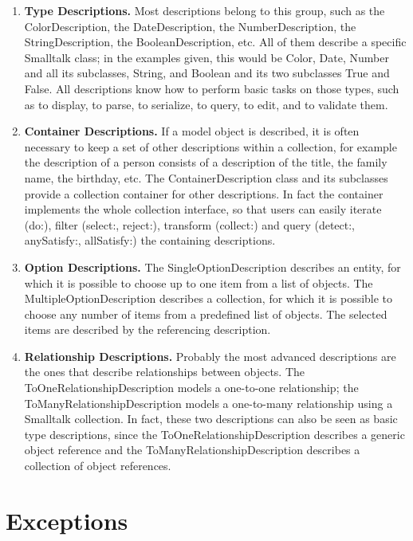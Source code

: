 \documentclass[a4paper,10pt,twoside]{book}
\newcommand{\ct}[1]{{\small\ttfamily\textup{#1}}}
\begin{document}
\begin{enumerate}
\item \textbf{Type Descriptions.} Most descriptions belong to this group, such as the \ct{ColorDescription}, the \ct{DateDescription}, the \ct{NumberDescription}, the \ct{StringDescription}, the \ct{BooleanDescription}, etc. All of them describe a specific Smalltalk class; in the examples given, this would be Color, Date, Number and all its subclasses, String, and Boolean and its two subclasses True and False. All descriptions know how to perform basic tasks on those types, such as to display, to parse, to serialize, to query, to edit, and to validate them.
\item \textbf{Container Descriptions.} If a model object is described, it is often necessary to keep a set of other descriptions within a collection, for example the description of a person consists of a description of the title, the family name, the birthday, etc. The \ct{ContainerDescription} class and its subclasses provide a collection container for other descriptions. In fact the container implements the whole collection interface, so that users can easily iterate (\ct{do:}), filter (\ct{select:}, \ct{reject:}), transform (\ct{collect:}) and query (\ct{detect:}, \ct{anySatisfy:}, \ct{allSatisfy:}) the containing descriptions.
\item \textbf{Option Descriptions.} The \ct{SingleOptionDescription} describes an entity, for which it is possible to choose up to one item from a list of objects. The \ct{MultipleOptionDescription} describes a collection, for which it is possible to choose any number of items from a predefined list of objects. The selected items are described by the referencing description.
\item \textbf{Relationship Descriptions.} Probably the most advanced descriptions are the ones that describe relationships between objects. The \ct{ToOneRelationshipDescription} models a one-to-one relationship; the \ct{ToManyRelationshipDescription} models a one-to-many relationship using a Smalltalk collection. In fact, these two descriptions can also be seen as basic type descriptions, since the \ct{ToOneRelationshipDescription} describes a generic object reference and the \ct{ToManyRelationshipDescription} describes a collection of object references. 
\end{enumerate}

\section{Exceptions}
\label{book:advanced:magritte:exceptions}
\end{document}
